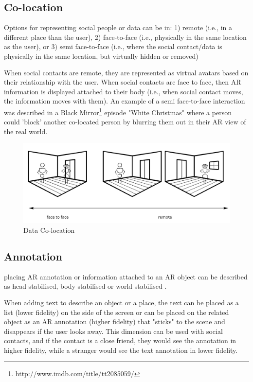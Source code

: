 \subsection{Co-location}

Options for representing social people or data can be in: 
1) remote (i.e., in a different place than the user), 
2) face-to-face (i.e., physically in the same location as the user), or 
3) semi face-to-face (i.e., where the social contact/data is physically in the same location, but virtually hidden or removed)

When social contacts are remote, they are represented as virtual avatars based on their relationship with the user. When social contacts are face to face, then AR information is displayed attached to their body (i.e., when social contact moves, the information moves with them). 
An example of a semi face-to-face interaction was described in a Black Mirror\footnote{http://www.imdb.com/title/tt2085059/} episode "White Christmas" where a person could 'block' another co-located person by blurring them out in their AR view of the real world.

\begin{figure}[h]
    \centering
    \includegraphics[width=0.8\linewidth]{images/continuum-colocation.jpg}
    \caption{Data Co-location}
    \label{fig:continuum:data-colocation}
\end{figure}


\subsection{Annotation}

placing AR annotation or information attached to an AR object can be described as head-stabilised, body-stabilised or world-stabilised \cite{Billinghurst1998}.

When adding text to describe an object or a place, the text can be placed as a list (lower fidelity) on the side of the screen or can be placed on the related object as an AR annotation (higher fidelity) that "sticks" to the scene and disappears if the user looks away. This dimension can be used with social contacts, and if the contact is a close friend, they would see the annotation in higher fidelity, while a stranger would see the text annotation in lower fidelity. 

